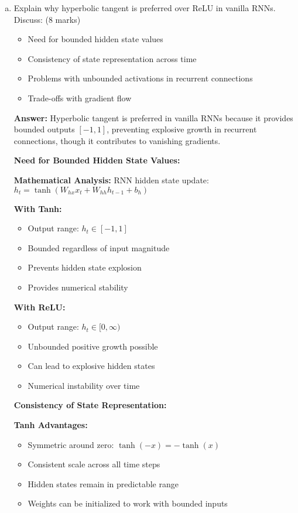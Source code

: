 \documentclass[12pt]{article}
\newcommand{\answer}[1]{{\color{answercolor}\textbf{Answer:} #1}}
\newcommand{\explanation}[1]{{\color{explanationcolor}#1}}
\begin{document}
\begin{enumerate}[(a)]
    \item Explain why hyperbolic tangent is preferred over ReLU in vanilla RNNs. Discuss: \hfill (8 marks)
    \begin{itemize}
        \item Need for bounded hidden state values
        \item Consistency of state representation across time
        \item Problems with unbounded activations in recurrent connections
        \item Trade-offs with gradient flow
    \end{itemize}
    
    \answer{Hyperbolic tangent is preferred in vanilla RNNs because it provides bounded outputs $[-1,1]$, preventing explosive growth in recurrent connections, though it contributes to vanishing gradients.}
    
    \explanation{
    \textbf{Need for Bounded Hidden State Values:}
    
    \textbf{Mathematical Analysis:}
    RNN hidden state update: $h_t = \tanh(W_{hx} x_t + W_{hh} h_{t-1} + b_h)$
    
    \textbf{With Tanh:}
    \begin{itemize}
        \item Output range: $h_t \in [-1, 1]$
        \item Bounded regardless of input magnitude
        \item Prevents hidden state explosion
        \item Provides numerical stability
    \end{itemize}
    
    \textbf{With ReLU:}
    \begin{itemize}
        \item Output range: $h_t \in [0, \infty)$
        \item Unbounded positive growth possible
        \item Can lead to explosive hidden states
        \item Numerical instability over time
    \end{itemize}
    
    \textbf{Consistency of State Representation:}
    
    \textbf{Tanh Advantages:}
    \begin{itemize}
        \item Symmetric around zero: $\tanh(-x) = -\tanh(x)$
        \item Consistent scale across all time steps
        \item Hidden states remain in predictable range
        \item Weights can be initialized to work with bounded inputs
    \end{itemize}
    
}
\end{enumerate}
\end{document}
